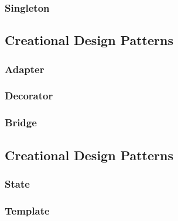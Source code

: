 \subsubsection{Singleton}

\subsection{Creational Design Patterns} 

\subsubsection{Adapter}

\subsubsection{Decorator}

\subsubsection{Bridge}

\subsection{Creational Design Patterns}

\subsubsection{State}

\subsubsection{Template}

